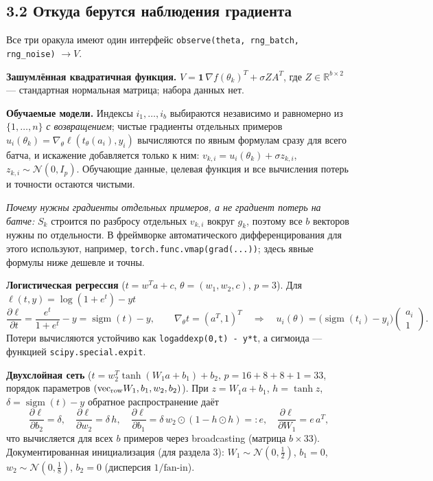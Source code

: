 \documentclass[11pt,a4paper]{article}
\begin{document}
\subsection*{3.2 Откуда берутся наблюдения градиента}

Все три оракула имеют один интерфейс \texttt{observe(theta, rng\_batch, rng\_noise)}
$\to V$.

\textbf{Зашумлённая квадратичная функция.} $V=\mathbf 1\,\nabla f(\theta_k)^T+\sigma ZA^T$,
где $Z\in\mathbb R^{b\times2}$ — стандартная нормальная матрица; набора данных нет.

\textbf{Обучаемые модели.} Индексы $i_1,\dots,i_b$ выбираются независимо и равномерно из
$\{1,\dots,n\}$ \emph{с возвращением}; чистые градиенты отдельных примеров
$u_{i}(\theta_k)=\nabla_\theta\ell(t_\theta(a_{i}),y_{i})$ вычисляются по явным формулам
сразу для всего батча, и искажение добавляется только к ним:
$v_{k,i}=u_{i}(\theta_k)+\sigma z_{k,i}$, $z_{k,i}\sim\mathcal N(0,I_p)$. Обучающие
данные, целевая функция и все вычисления потерь и точности остаются чистыми.

\emph{Почему нужны градиенты отдельных примеров, а не градиент потерь на батче:}
$S_k$ строится по разбросу отдельных $v_{k,i}$ вокруг $g_k$, поэтому все $b$ векторов
нужны по отдельности. В фреймворке автоматического дифференцирования для этого
используют, например, \texttt{torch.func.vmap(grad(...))}; здесь явные формулы ниже
дешевле и точны.

\textbf{Логистическая регрессия} ($t=w^Ta+c$, $\theta=(w_1,w_2,c)$, $p=3$). Для
$\ell(t,y)=\log(1+e^t)-yt$
\begin{equation*}
\frac{\partial\ell}{\partial t}=\frac{e^t}{1+e^t}-y=\operatorname{sigm}(t)-y,\qquad
\nabla_\theta t=(a^T,1)^T\quad\Longrightarrow\quad
u_i(\theta)=\big(\operatorname{sigm}(t_i)-y_i\big)\begin{pmatrix}a_i\\1\end{pmatrix}.
\end{equation*}
Потери вычисляются устойчиво как \texttt{logaddexp(0,t)~-~y*t}, а сигмоида —
функцией \texttt{scipy.special.expit}.

\textbf{Двухслойная сеть} ($t=w_2^T\tanh(W_1a+b_1)+b_2$, $p=16+8+8+1=33$, порядок
параметров $(\mathrm{vec}_{\rm row}W_1,b_1,w_2,b_2)$). При $z=W_1a+b_1$, $h=\tanh z$,
$\delta=\operatorname{sigm}(t)-y$ обратное распространение даёт
\begin{equation*}
\frac{\partial\ell}{\partial b_2}=\delta,\quad
\frac{\partial\ell}{\partial w_2}=\delta\,h,\quad
\frac{\partial\ell}{\partial b_1}=\delta\,w_2\odot(1-h\odot h)=:e,\quad
\frac{\partial\ell}{\partial W_1}=e\,a^T,
\end{equation*}
что вычисляется для всех $b$ примеров через broadcasting (матрица $b\times33$).
Документированная инициализация (для раздела 3): $W_1\sim\mathcal N(0,\tfrac12)$,
$b_1=0$, $w_2\sim\mathcal N(0,\tfrac18)$, $b_2=0$ (дисперсия $1/\text{fan-in}$).
\end{document}
